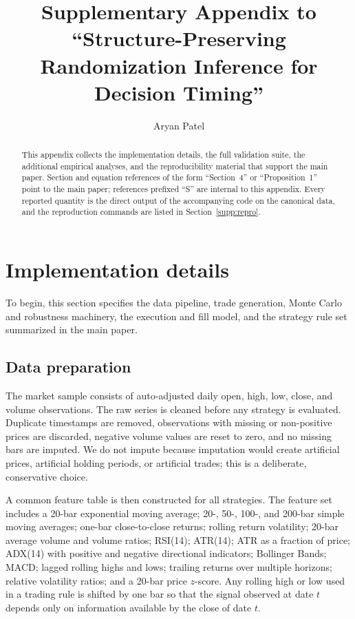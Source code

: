 \documentclass[preprint,12pt]{elsarticle}
\theoremstyle{definition}
\begin{document}
\begin{frontmatter}
\title{Supplementary Appendix to\\ ``Structure-Preserving Randomization Inference for Decision Timing''}
\author{Aryan Patel}
\begin{abstract}
\noindent This appendix collects the implementation details, the full validation
suite, the additional empirical analyses, and the reproducibility material that
support the main paper. Section and equation references of the form ``Section~4''
or ``Proposition~1'' point to the main paper; references prefixed ``S'' are internal
to this appendix. Every reported quantity is the direct output of the accompanying
code on the canonical data, and the reproduction commands are listed in
Section~\ref{supp:repro}.
\end{abstract}
\end{frontmatter}

\setcounter{section}{0}

\section{Implementation details}
\label{supp:implementation}

To begin, this section specifies the data pipeline, trade generation, Monte Carlo and robustness machinery, the execution and fill model, and the strategy rule set summarized in the main paper.

\subsection{Data preparation}

The market sample consists of auto-adjusted daily open, high, low, close, and volume observations. The raw series is cleaned before any strategy is evaluated. Duplicate timestamps are removed, observations with missing or non-positive prices are discarded, negative volume values are reset to zero, and no missing bars are imputed. We do not impute because imputation would create artificial prices, artificial holding periods, or artificial trades; this is a deliberate, conservative choice.

A common feature table is then constructed for all strategies. The feature set includes a 20-bar exponential moving average; 20-, 50-, 100-, and 200-bar simple moving averages; one-bar close-to-close returns; rolling return volatility; 20-bar average volume and volume ratios; RSI(14); ATR(14); ATR as a fraction of price; ADX(14) with positive and negative directional indicators; Bollinger Bands; MACD; lagged rolling highs and lows; trailing returns over multiple horizons; relative volatility ratios; and a 20-bar price $z$-score. Any rolling high or low used in a trading rule is shifted by one bar so that the signal observed at date $t$ depends only on information available by the close of date $t$.
\end{document}
